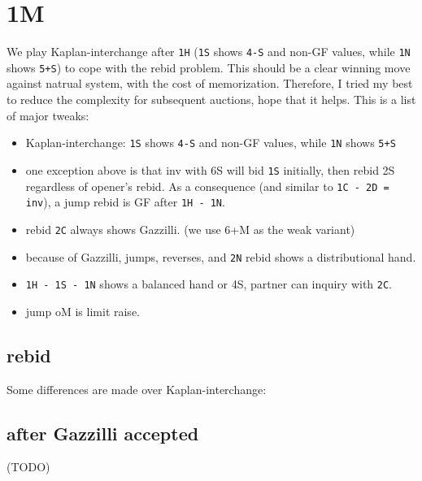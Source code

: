\section{1M}

We play Kaplan-interchange after \texttt{1H} (\texttt{1S} shows \texttt{4-S} and non-GF values, while \texttt{1N} shows \texttt{5+S}) to cope with the rebid problem.
This should be a clear winning move against natrual system, with the cost of memorization. 
Therefore, I tried my best to reduce the complexity for subsequent auctions, hope that it helps.
This is a list of major tweaks:
\begin{itemize}
    \setlength\itemsep{0pt}
    \item Kaplan-interchange: \texttt{1S} shows \texttt{4-S} and non-GF values, while \texttt{1N} shows \texttt{5+S}
    \item one exception above is that inv with 6S will bid \texttt{1S} initially, then rebid 2S regardless of opener's rebid. As a consequence (and similar to \texttt{1C - 2D = inv}), a jump rebid is GF after \texttt{1H - 1N}.
    \item rebid \texttt{2C} always shows Gazzilli. (we use 6+M as the weak variant)
    \item because of Gazzilli, jumps, reverses, and \texttt{2N} rebid shows a distributional hand.
    \item \texttt{1H - 1S - 1N} shows a balanced hand or 4S, partner can inquiry with \texttt{2C}.
    \item jump oM is limit raise.
\end{itemize}


\subsection{rebid}


Some differences are made over Kaplan-interchange:

\subsection{after Gazzilli accepted}

(TODO)

